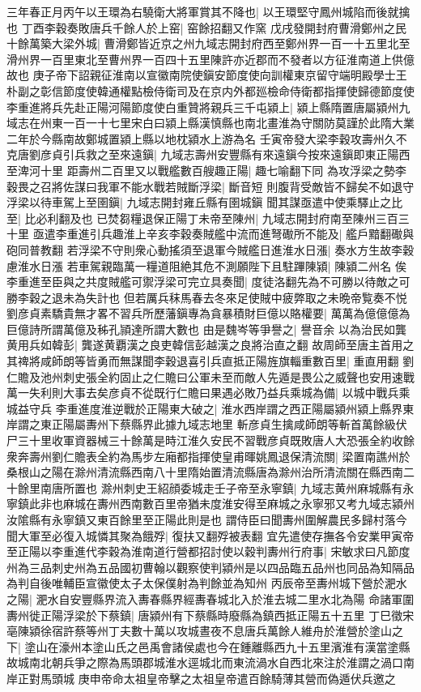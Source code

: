 三年春正月丙午以王環為右驍衛大將軍賞其不降也|{
	以王環堅守鳳州城陷而後就擒也}
丁酉李穀奏敗唐兵千餘人於上窑|{
	窑餘招翻又作窯}
戊戌發開封府曹滑鄭州之民十餘萬築大梁外城|{
	曹滑鄭皆近京之州九域志開封府西至鄭州界一百一十五里北至滑州界一百里東北至曹州界一百四十五里陳許亦近郡而不發者以方征淮南道上供億故也}
庚子帝下詔親征淮南以宣徽南院使鎭安節度使向訓權東京留守端明殿學士王朴副之彰信節度使韓通權點檢侍衛司及在京内外都廵檢命侍衛都指揮使歸德節度使李重進將兵先赴正陽河陽節度使白重贊將親兵三千屯潁上|{
	潁上縣隋置唐屬潁州九域志在州東一百一十七里宋白曰潁上縣漢慎縣也南北畫淮為守關防莫謹於此隋大業二年於今縣南故鄭城置潁上縣以地枕潁水上游為名}
壬寅帝發大梁李穀攻壽州久不克唐劉彦貞引兵救之至來遠鎭|{
	九域志壽州安豐縣有來遠鎭今按來遠鎭即東正陽西至渒河十里}
距壽州二百里又以戰艦數百艘趣正陽|{
	趣七喻翻下同}
為攻浮梁之勢李穀畏之召將佐謀曰我軍不能水戰若賊斷浮梁|{
	斷音短}
則腹背受敵皆不歸矣不如退守浮梁以待車駕上至圉鎭|{
	九域志開封雍丘縣有圉城鎭}
聞其謀亟遣中使乘驛止之比至|{
	比必利翻及也}
已焚芻糧退保正陽丁未帝至陳州|{
	九域志開封府南至陳州三百三十里}
亟遣李重進引兵趣淮上辛亥李穀奏賊艦中流而進弩礮所不能及|{
	艦戶黯翻礮與砲同普教翻}
若浮梁不守則衆心動搖須至退軍今賊艦日進淮水日漲|{
	奏水方生故李穀慮淮水日漲}
若車駕親臨萬一糧道阻絶其危不測願陛下且駐蹕陳潁|{
	陳潁二州名}
俟李重進至臣與之共度賊艦可禦浮梁可完立具奏聞|{
	度徒洛翻先為不可勝以待敵之可勝李穀之退未為失計也}
但若厲兵秣馬春去冬來足使賊中疲弊取之未晩帝覧奏不悦劉彦貞素驕貴無才畧不習兵所歷藩鎭專為貪暴積財巨億以賂權要|{
	萬萬為億億億為巨億詩所謂萬億及秭孔頴達所謂大數也}
由是魏岑等爭譽之|{
	譽音余}
以為治民如龔黄用兵如韓彭|{
	龔遂黄覇漢之良吏韓信彭越漢之良將治直之翻}
故周師至唐主首用之其禆將咸師朗等皆勇而無謀聞李穀退喜引兵直抵正陽旌旗輜重數百里|{
	重直用翻}
劉仁贍及池州刺史張全約固止之仁贍曰公軍未至而敵人先遁是畏公之威聲也安用速戰萬一失利則大事去矣彦貞不從既行仁贍曰果遇必敗乃益兵乘城為備|{
	以城中戰兵乘城益守兵}
李重進度淮逆戰於正陽東大破之|{
	淮水西岸謂之西正陽屬潁州潁上縣界東岸謂之東正陽屬夀州下蔡縣界此據九域志地里}
斬彦貞生擒咸師朗等斬首萬餘級伏尸三十里收軍資器械三十餘萬是時江淮久安民不習戰彦貞既敗唐人大恐張全約收餘衆奔壽州劉仁贍表全約為馬步左廂都指揮使皇甫暉姚鳳退保清流關|{
	梁置南譙州於桑根山之陽在滁州清流縣西南八十里隋始置清流縣唐為滁州治所清流關在縣西南二十餘里南唐所置也}
滁州刺史王紹顔委城走壬子帝至永寧鎮|{
	九域志黄州麻城縣有永寧鎮此非也麻城在夀州西南數百里帝猶未度淮安得至麻城之永寧邪又考九域志潁州汝隂縣有永寧鎮又東百餘里至正陽此則是也}
謂侍臣曰聞夀州圍解農民多歸村落今聞大軍至必復入城憐其聚為餓殍|{
	復扶又翻殍被表翻}
宜先遣使存撫各令安業甲寅帝至正陽以李重進代李穀為淮南道行營都招討使以穀判夀州行府事|{
	宋敏求曰凡節度州為三品刺史州為五品國初曹翰以觀察使判潁州是以四品臨五品州也同品為知隔品為判自後唯輔臣宣徽使太子太保僕射為判餘並為知州}
丙辰帝至夀州城下營於淝水之陽|{
	淝水自安豐縣界流入夀春縣界經夀春城北入於淮去城二里水北為陽}
命諸軍圍夀州徙正陽浮梁於下蔡鎮|{
	唐潁州有下蔡縣時廢縣為鎮西抵正陽五十五里}
丁巳徵宋亳陳潁徐宿許蔡等州丁夫數十萬以攻城晝夜不息唐兵萬餘人維舟於淮營於塗山之下|{
	塗山在濠州本塗山氏之邑禹會諸侯處也今在鍾離縣西九十五里濱淮有漢當塗縣故城南北朝兵爭之際為馬頭郡城淮水逕城北而東流渦水自西北來注於淮謂之渦口南岸正對馬頭城}
庚申帝命太祖皇帝擊之太祖皇帝遣百餘騎薄其營而偽遁伏兵邀之

